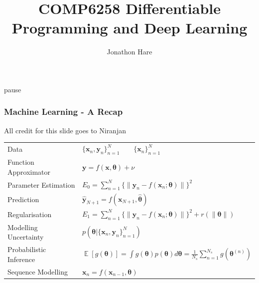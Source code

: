 \documentclass[\beamerclass]{beamer}
\title[COMP6258 Deep Learning]{COMP6258 Differentiable Programming and Deep Learning}
\author{Jonathon Hare}
\institute[]
{
  Vision, Learning and Control\\
  University of Southampton 
}
\date{}
\begin{document}
\begin{frame}[plain]
\end{frame}

\frame{
  \titlepage
}

\begin{frame}{pause}
\frametitle{Machine Learning - A Recap}
{\tiny All credit for this slide goes to Niranjan}\\
\vspace{5mm}
\begin{tabular}{ll}
Data & $\{\bm{x}_n, \bm{y}_n\}^N_{n=1} \qquad \{\bm{x}_n\}^N_{n=1}$ 
\vspace{3mm} \\ \pause
Function Approximator & $\bm{y} = f (\bm{x}, \bm{\theta}) + \nu$ 
\vspace{3mm} \\ \pause
Parameter Estimation & $E_0 = \sum^N_{n=1} \{\|\bm{y}_n - f (\bm{x}_n; \bm{\theta})\|\}^2$
\vspace{3mm} \\ \pause
Prediction & $\bm{\hat y}_{N+1} = f(\bm{x}_{N+1}, \bm{\hat \theta})$
\vspace{3mm} \\ \pause
Regularisation & $E_1 = \sum^N_{n=1} \{\|\bm{y}_n - f (\bm{x}_n; \bm{\theta})\|\}^2 + r(\|\bm\theta\|)$
\vspace{3mm} \\ \pause
Modelling Uncertainty & $p(\bm\theta|\{\bm x_n, \bm y_n\}_{n=1}^N)$
\vspace{3mm} \\ \pause
Probabilistic Inference & $\mathop{\mathbb{E}}[g(\bm\theta)] = \int g(\bm\theta)p(\bm\theta)d\bm\theta = \frac{1}{N_s}\sum_{n=1}^{N_s}g(\bm\theta^{(n)})$
\vspace{3mm} \\ \pause
Sequence Modelling & $\bm x_n = f(\bm x_{n-1}, \bm\theta)$
\end{tabular}
\vspace{5mm}
\end{frame}
\end{document}

